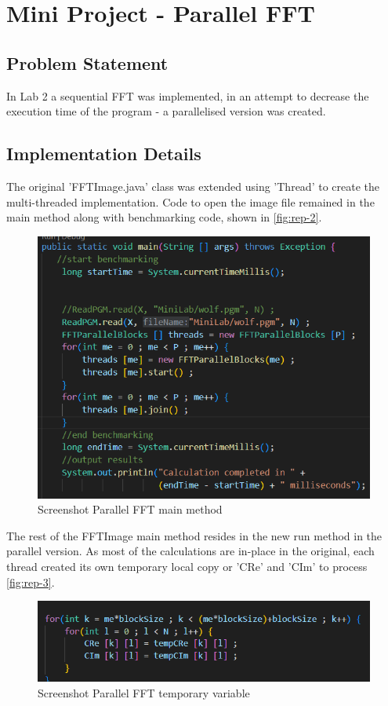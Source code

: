 \chapter{Mini Project - Parallel FFT}
\section{Problem Statement}
In Lab 2 a sequential FFT was implemented, in an attempt to decrease the execution time of the program - a parallelised version was created.
\section{Implementation Details}
The original 'FFTImage.java' class was extended using 'Thread' to create the multi-threaded implementation. Code to open the image file remained in the main method along with benchmarking code, shown in \autoref{fig:rep-2}. 
\begin{figure}[H] 
    \centering
    \includegraphics[width=0.9\columnwidth]{Figures/Report/2.png}
    \caption{Screenshot Parallel FFT main method }
    \label{fig:rep-2}
\end{figure}

The rest of the FFTImage main method resides in the new run method in the parallel version. 
As most of the calculations are in-place in the original, each thread created its own temporary local copy or 'CRe' and 'CIm' to process \autoref{fig:rep-3}.
\begin{figure}[H] 
    \centering
    \includegraphics[width=0.9\columnwidth]{Figures/Report/4.png}
    \caption{Screenshot Parallel FFT temporary variable}
    \label{fig:rep-3}
\end{figure}


